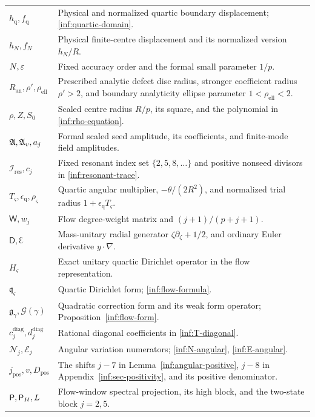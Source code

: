 \begin{longtable}{@{}>{\raggedright\arraybackslash}p{}>{\raggedright\arraybackslash}p{}@{}}
$h_{\mathrm q},f_{\mathrm q}$ & Physical and normalized quartic boundary displacement; \eqref{inf:quartic-domain}.\\
$h_N,f_N$ & Physical finite-centre displacement and its normalized version $h_N/R$.\\
$N,\varepsilon$ & Fixed accuracy order and the formal small parameter $1/p$.\\
$R_{\mathrm{an}},\rho',\rho_{\mathrm{ell}}$ & Prescribed analytic defect disc radius, stronger coefficient radius $\rho'>2$, and boundary analyticity ellipse parameter $1<\rho_{\mathrm{ell}}<2$.\\
$\rho,Z,S_0$ & Scaled centre radius $R/p$, its square, and the polynomial in \eqref{inf:rho-equation}.\\
$\mathfrak A,\mathfrak A_v,a_j$ & Formal scaled seed amplitude, its coefficients, and finite-mode field amplitudes.\\
$\mathcal I_{\mathrm{res}},c_j$ & Fixed resonant index set $\{2,5,8,\ldots\}$ and positive nonseed divisors in \eqref{inf:resonant-trace}.\\
$T_\varsigma,\epsilon_{\mathrm q},\rho_\varsigma$ & Quartic angular multiplier, $-\theta/(2R^2)$, and normalized trial radius $1+\epsilon_{\mathrm q}T_\varsigma$.\\
$\mathsf W,w_j$ & Flow degree-weight matrix and $(j+1)/(p+j+1)$.\\
$\mathsf D,\Euler$ & Mass-unitary radial generator $\zeta\partial_\zeta+1/2$, and ordinary Euler derivative $y\cdot\nabla$.\\
$H_\varsigma$ & Exact unitary quartic Dirichlet operator in the flow representation.\\
$\mathfrak q_\varsigma$ & Quartic Dirichlet form; \eqref{inf:flow-formula}.\\
$\mathfrak g_\gamma,\mathcal G(\gamma)$ & Quadratic correction form and its weak form operator; Proposition~\ref{inf:flow-form}.\\
$c_j^{\mathrm{diag}},d_j^{\mathrm{diag}}$ & Rational diagonal coefficients in \eqref{inf:T-diagonal}.\\
$\mathcal N_j,\mathcal E_j$ & Angular variation numerators; \eqref{inf:N-angular}, \eqref{inf:E-angular}.\\
$j_{\mathrm{pos}},v,D_{\mathrm{pos}}$ & The shifts $j-7$ in Lemma~\ref{inf:angular-positive}, $j-8$ in Appendix~\ref{inf:sec-positivity}, and its positive denominator.\\
$\mathsf P,\mathsf P_H,L$ & Flow-window spectral projection, its high block, and the two-state block $j=2,5$.\\

\end{longtable}
